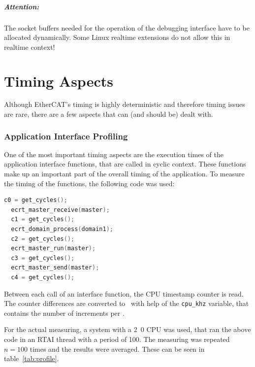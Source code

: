 \documentclass[a4paper,12pt,BCOR6mm,bibtotoc,idxtotoc]{scrbook}
\begin{document}
\paragraph{Attention:} The socket buffers needed for the operation of
the debugging interface have to be allocated dynamically. Some Linux
realtime extensions do not allow this in realtime context!


\chapter{Timing Aspects}
\label{sec:timing}

Although EtherCAT's timing is highly deterministic and therefore timing issues
are rare, there are a few aspects that can (and should be) dealt with.


\subsection{Application Interface Profiling}
\label{sec:timing-profile}

One of the most important timing aspects are the execution times of the
application interface functions, that are called in cyclic context. These
functions make up an important part of the overall timing of the application.
To measure the timing of the functions, the following code was used:

\begin{lstlisting}[gobble=2,language=C]
  c0 = get_cycles();
  ecrt_master_receive(master);
  c1 = get_cycles();
  ecrt_domain_process(domain1);
  c2 = get_cycles();
  ecrt_master_run(master);
  c3 = get_cycles();
  ecrt_master_send(master);
  c4 = get_cycles();
\end{lstlisting}

Between each call of an interface function, the CPU timestamp counter is read.
The counter differences are converted to \micro\second\ with help of the
\lstinline+cpu_khz+ variable, that contains the number of increments per
\milli\second.

For the actual measuring, a system with a \unit{2.0}{\giga\hertz} CPU was used,
that ran the above code in an RTAI thread with a period of
\unit{100}{\micro\second}. The measuring was repeated $n = 100$ times and the
results were averaged. These can be seen in table~\ref{tab:profile}.
\end{document}
